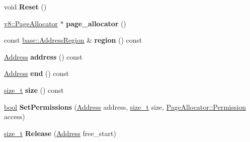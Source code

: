 \begin{DoxyCompactItemize}
\item 
\mbox{\label{classv8_1_1internal_1_1VirtualMemory_aacdcb5f689db1e7346aa047b27637c00}} 
void {\bfseries Reset} ()
\item 
\mbox{\label{classv8_1_1internal_1_1VirtualMemory_a9c7beaf13c4ed4a1e87eeddc83577d09}} 
\mbox{\hyperlink{classv8_1_1PageAllocator}{v8\+::\+Page\+Allocator}} $\ast$ {\bfseries page\+\_\+allocator} ()
\item 
\mbox{\label{classv8_1_1internal_1_1VirtualMemory_a189b2051e0b85c97fd761d87f2ee207a}} 
const \mbox{\hyperlink{classv8_1_1base_1_1AddressRegion}{base\+::\+Address\+Region}} \& {\bfseries region} () const
\item 
\mbox{\label{classv8_1_1internal_1_1VirtualMemory_ae9a440f195e1f00ff57e360c163d9b33}} 
\mbox{\hyperlink{classuintptr__t}{Address}} {\bfseries address} () const
\item 
\mbox{\label{classv8_1_1internal_1_1VirtualMemory_a5dd4e21fcfe750201d1d054d088c1368}} 
\mbox{\hyperlink{classuintptr__t}{Address}} {\bfseries end} () const
\item 
\mbox{\label{classv8_1_1internal_1_1VirtualMemory_a48f0249dbd8fb6b9fdd45b51037e9c90}} 
\mbox{\hyperlink{classsize__t}{size\+\_\+t}} {\bfseries size} () const
\item 
\mbox{\label{classv8_1_1internal_1_1VirtualMemory_ab9d171acf0e9958c506fd0e7c885f529}} 
\mbox{\hyperlink{classbool}{bool}} {\bfseries Set\+Permissions} (\mbox{\hyperlink{classuintptr__t}{Address}} address, \mbox{\hyperlink{classsize__t}{size\+\_\+t}} size, \mbox{\hyperlink{classv8_1_1PageAllocator_a88f74b164fe97e053259f67a95758415}{Page\+Allocator\+::\+Permission}} access)
\item 
\mbox{\label{classv8_1_1internal_1_1VirtualMemory_ab1cc06b20f4379874b06e8c894d7e8ea}} 
\mbox{\hyperlink{classsize__t}{size\+\_\+t}} {\bfseries Release} (\mbox{\hyperlink{classuintptr__t}{Address}} free\+\_\+start)

\end{DoxyCompactItemize}
